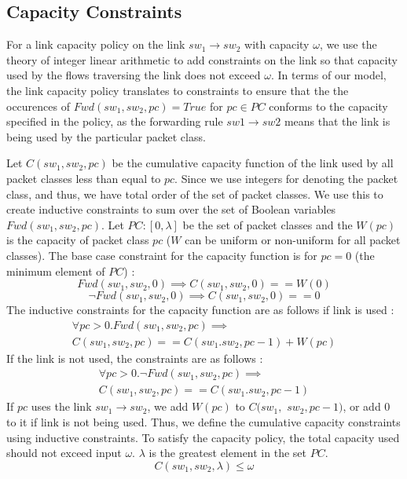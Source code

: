\documentclass[]{sig}
\begin{document}
\subsection{Capacity Constraints}
For a link capacity policy on the link $sw_1 \rightarrow sw_2$ with capacity $\omega$, we use the theory of integer linear arithmetic to add constraints on the link so that capacity used by the flows traversing the link does not exceed $\omega$. In terms of our model, the link capacity policy translates to constraints to ensure that the the occurences of $Fwd(sw_1, sw_2, pc) = True$ for $pc \in PC$ conforms to the capacity specified in the policy, as the forwarding rule $sw1 \rightarrow sw2$ means that the link is being used by the particular packet class.
 
Let $C(sw_1,sw_2,pc)$ be the cumulative capacity function of the link used by all packet classes less than equal to $pc$. Since we use integers for denoting the packet class, and thus, we have total order of the set of packet classes. We use this to create inductive constraints to sum over the set of Boolean variables $Fwd(sw_1, sw_2,pc)$. Let $PC : [0, \lambda]$ be the set of packet classes and the $W(pc)$ is the capacity of packet class $pc$ ($W$ can be uniform or non-uniform for all packet classes). 
The base case constraint for the capacity function is for $pc = 0$ (the minimum element of $PC$) :
\begin{equation}
	Fwd(sw_1, sw_2, 0) \implies C(sw_1, sw_2, 0) == W(0)
\end{equation}
\begin{equation}
	\neg Fwd(sw_1, sw_2, 0) \implies C(sw_1, sw_2, 0) == 0
\end{equation} 
The inductive constraints for the capacity function are as follows if link is used : 
\begin{multline}
	\forall pc > 0. Fwd(sw_1,sw_2,pc) \implies \\ C(sw_1, sw_2, pc) ==  C(sw_1. sw_2, pc - 1) + W(pc)
\end{multline}
If the link is not used, the constraints are as follows : 
\begin{multline}
\forall pc > 0. \neg Fwd(sw_1,sw_2,pc) \implies \\ C(sw_1, sw_2, pc) ==  C(sw_1. sw_2, pc - 1)
\end{multline}
If $pc$ uses the link $sw_1 \rightarrow sw_2$, we add $W(pc)$ to $C(sw_1,$ $sw_2,pc-1)$, or add 0 to it if link is not being used. Thus, we define the cumulative capacity constraints using inductive constraints. To satisfy the capacity policy, the total capacity used should not exceed input $\omega$. $\lambda$ is the greatest element in the set $PC$. 
\begin{equation}
	C(sw_1, sw_2, \lambda) \leq \omega	
\end{equation} 
\end{document}
